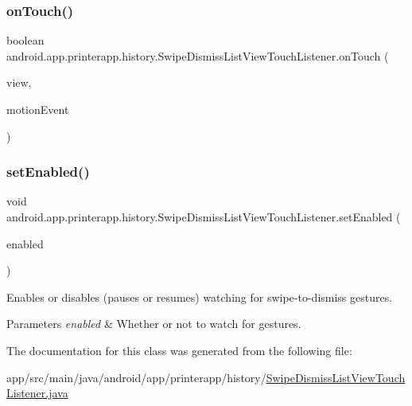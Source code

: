 \subsubsection{\texorpdfstring{on\+Touch()}{onTouch()}}
{\footnotesize\ttfamily boolean android.\+app.\+printerapp.\+history.\+Swipe\+Dismiss\+List\+View\+Touch\+Listener.\+on\+Touch (\begin{DoxyParamCaption}\item[{View}]{view,  }\item[{Motion\+Event}]{motion\+Event }\end{DoxyParamCaption})}

\mbox{\label{classandroid_1_1app_1_1printerapp_1_1history_1_1_swipe_dismiss_list_view_touch_listener_aa158267502b577998675a6ce92319818}} 
\subsubsection{\texorpdfstring{set\+Enabled()}{setEnabled()}}
{\footnotesize\ttfamily void android.\+app.\+printerapp.\+history.\+Swipe\+Dismiss\+List\+View\+Touch\+Listener.\+set\+Enabled (\begin{DoxyParamCaption}\item[{boolean}]{enabled }\end{DoxyParamCaption})}

Enables or disables (pauses or resumes) watching for swipe-\/to-\/dismiss gestures.


\begin{DoxyParams}{Parameters}
{\em enabled} & Whether or not to watch for gestures. \\
\hline
\end{DoxyParams}


The documentation for this class was generated from the following file\+:\begin{DoxyCompactItemize}
\item 
app/src/main/java/android/app/printerapp/history/\hyperlink{_swipe_dismiss_list_view_touch_listener_8java}{Swipe\+Dismiss\+List\+View\+Touch\+Listener.\+java}\end{DoxyCompactItemize}
